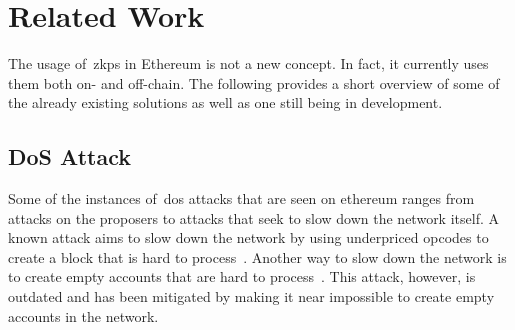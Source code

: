 

\section{Related Work}\label{sec:related-work}
The usage of~\glspl{zkp} in Ethereum is not a new concept.
In fact, it currently uses them both on- and off-chain.
The following provides a short overview of some of the already existing solutions as well as one still being in development.


%

\subsection{DoS Attack}\label{subsec:dos-attack}
Some of the instances of~\gls{dos} attacks that are seen on ethereum ranges from attacks on the proposers to attacks that seek to slow down the network itself.
A known attack aims to slow down the network by using underpriced opcodes to create a block that is hard to process~\cite{10.1145/3391195,9815256}.
Another way to slow down the network is to create empty accounts that are hard to process~\cite{empty-account-mitigation,empty-account-eip-mitigation}.
This attack, however, is outdated and has been mitigated by making it near impossible to create empty accounts in the network.

